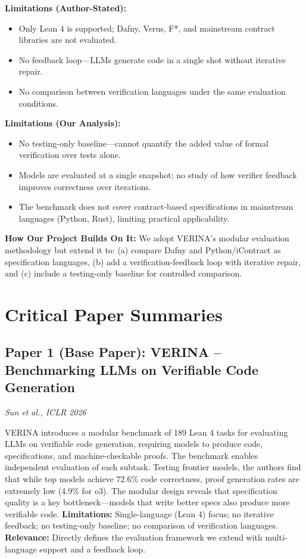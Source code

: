 \documentclass[11pt,a4paper]{article}
\begin{document}
\textbf{Limitations (Author-Stated):}
\begin{itemize}[noitemsep]
    \item Only Lean 4 is supported; Dafny, Verus, F*, and mainstream contract libraries are not evaluated.
    \item No feedback loop---LLMs generate code in a single shot without iterative repair.
    \item No comparison between verification languages under the same evaluation conditions.
\end{itemize}

\textbf{Limitations (Our Analysis):}
\begin{itemize}[noitemsep]
    \item No testing-only baseline---cannot quantify the added value of formal verification over tests alone.
    \item Models are evaluated at a single snapshot; no study of how verifier feedback improves correctness over iterations.
    \item The benchmark does not cover contract-based specifications in mainstream languages (Python, Rust), limiting practical applicability.
\end{itemize}

\textbf{How Our Project Builds On It:} We adopt VERINA's modular evaluation methodology but extend it to: (a) compare Dafny and Python/iContract as specification languages, (b) add a verification-feedback loop with iterative repair, and (c) include a testing-only baseline for controlled comparison.

\section{Critical Paper Summaries}

\subsection{Paper 1 (Base Paper): VERINA -- Benchmarking LLMs on Verifiable Code Generation}
\textit{Sun et al., ICLR 2026} \cite{verina2026}

VERINA introduces a modular benchmark of 189 Lean 4 tasks for evaluating LLMs on verifiable code generation, requiring models to produce code, specifications, and machine-checkable proofs. The benchmark enables independent evaluation of each subtask. Testing frontier models, the authors find that while top models achieve 72.6\% code correctness, proof generation rates are extremely low (4.9\% for o3). The modular design reveals that specification quality is a key bottleneck---models that write better specs also produce more verifiable code. \textbf{Limitations:} Single-language (Lean 4) focus; no iterative feedback; no testing-only baseline; no comparison of verification languages. \textbf{Relevance:} Directly defines the evaluation framework we extend with multi-language support and a feedback loop.
\end{document}
